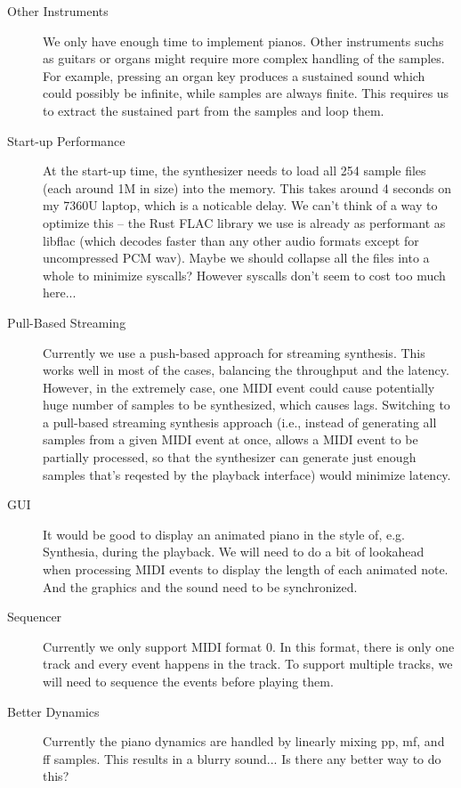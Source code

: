 \documentclass{article}
\begin{document}
\begin{description}
  \item [Other Instruments] We only have enough time to implement pianos.
    Other instruments suchs as guitars or organs might require more complex
    handling of the samples. For example, pressing an organ key produces
    a sustained sound which could possibly be infinite, while samples
    are always finite. This requires us to extract the sustained part from
    the samples and loop them.

  \item [Start-up Performance] At the start-up time, the synthesizer needs
    to load all 254 sample files (each around 1M in size) into the memory. This
    takes around 4 seconds on my 7360U laptop, which is a noticable delay. We can't
    think of a way to optimize this -- the Rust FLAC library we use is already
    as performant as libflac (which decodes faster than any other audio
    formats except for uncompressed PCM wav). Maybe we should collapse all
    the files into a whole to minimize syscalls? However syscalls don't
    seem to cost too much here...
    
  \item [Pull-Based Streaming] Currently we use a push-based approach for streaming
    synthesis. This works well in most of the cases, balancing the throughput
    and the latency. However, in the extremely case, one MIDI event could cause
    potentially huge number of samples to be synthesized, which causes lags.
    Switching to a pull-based streaming synthesis approach (i.e., instead of
    generating all samples from a given MIDI event at once, allows a MIDI event
    to be partially processed, so that the synthesizer can generate just enough
    samples that's reqested by the playback interface) would minimize
    latency.

  \item [GUI] It would be good to display an animated piano in the style
    of, e.g. Synthesia, during the playback. We will need to do a bit of
    lookahead when processing MIDI events to display the length of each
    animated note. And the graphics and the sound need to be synchronized.

  \item [Sequencer] Currently we only support MIDI format 0. In this format, there
    is only one track and every event happens in the track. To support
    multiple tracks, we will need to sequence the events before playing them.

  \item [Better Dynamics] Currently the piano dynamics are handled by
    linearly mixing pp, mf, and ff samples. This results in a blurry sound...
    Is there any better way to do this?
\end{description}
\end{document}
